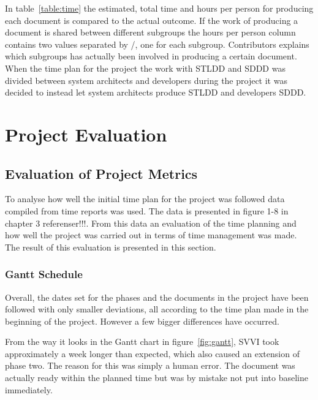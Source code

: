 \documentclass[a4paper]{article}
\begin{document}
In table~\ref{table:time} the estimated, total time and hours per person for producing each document is compared to the actual outcome. If the work of producing a document is shared between different subgroups the hours per person column contains two values separated by /, one for each subgroup. Contributors explains which subgroups has actually been involved in producing a certain document. When the time plan for the project the work with STLDD and SDDD was divided between system architects and developers during the project it was decided to instead let system architects produce STLDD and developers SDDD. 

\FloatBarrier
\section{Project Evaluation}


\subsection{Evaluation of Project Metrics}
\label{sec:meval}

To analyse how well the initial time plan for the project was followed data compiled from time reports was used. The data is presented in figure 1-8 in chapter 3 referenser!!!. From this data an evaluation of the time planning and how well the project was carried out in terms of time management was made. The result of this  evaluation is presented in this section.   

\subsubsection{Gantt Schedule}
Overall, the dates set for the phases and the documents in the project have been followed with only smaller deviations, all according to the time plan made in the beginning of the project. However a few bigger differences have occurred.

From the way it looks in the Gantt chart in figure~\ref{fig:gantt}, SVVI took approximately a week longer than expected, which also caused an extension of phase two. The reason for this was simply a human error. The document was actually ready within the planned time but was by mistake not put into baseline immediately. 
\end{document}
